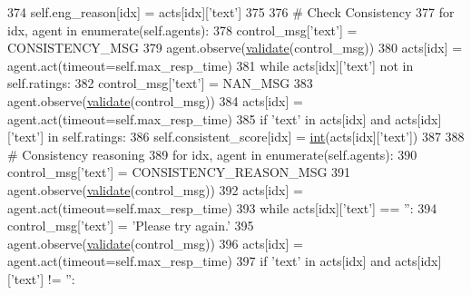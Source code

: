 \begin{DoxyCode}
374                             self.eng\_reason[idx] = acts[idx][\textcolor{stringliteral}{'text'}]
375 
376                     \textcolor{comment}{# Check Consistency}
377                     \textcolor{keywordflow}{for} idx, agent \textcolor{keywordflow}{in} enumerate(self.agents):
378                         control\_msg[\textcolor{stringliteral}{'text'}] = CONSISTENCY\_MSG
379                         agent.observe(\hyperlink{namespaceparlai_1_1core_1_1worlds_afc3fad603b7bce41dbdc9cdc04a9c794}{validate}(control\_msg))
380                         acts[idx] = agent.act(timeout=self.max\_resp\_time)
381                         \textcolor{keywordflow}{while} acts[idx][\textcolor{stringliteral}{'text'}] \textcolor{keywordflow}{not} \textcolor{keywordflow}{in} self.ratings:
382                             control\_msg[\textcolor{stringliteral}{'text'}] = NAN\_MSG
383                             agent.observe(\hyperlink{namespaceparlai_1_1core_1_1worlds_afc3fad603b7bce41dbdc9cdc04a9c794}{validate}(control\_msg))
384                             acts[idx] = agent.act(timeout=self.max\_resp\_time)
385                         \textcolor{keywordflow}{if} \textcolor{stringliteral}{'text'} \textcolor{keywordflow}{in} acts[idx] \textcolor{keywordflow}{and} acts[idx][\textcolor{stringliteral}{'text'}] \textcolor{keywordflow}{in} self.ratings:
386                             self.consistent\_score[idx] = \hyperlink{namespacelanguage__model_1_1eval__ppl_a7d12ee00479673c5c8d1f6d01faa272a}{int}(acts[idx][\textcolor{stringliteral}{'text'}])
387 
388                     \textcolor{comment}{# Consistency reasoning}
389                     \textcolor{keywordflow}{for} idx, agent \textcolor{keywordflow}{in} enumerate(self.agents):
390                         control\_msg[\textcolor{stringliteral}{'text'}] = CONSISTENCY\_REASON\_MSG
391                         agent.observe(\hyperlink{namespaceparlai_1_1core_1_1worlds_afc3fad603b7bce41dbdc9cdc04a9c794}{validate}(control\_msg))
392                         acts[idx] = agent.act(timeout=self.max\_resp\_time)
393                         \textcolor{keywordflow}{while} acts[idx][\textcolor{stringliteral}{'text'}] == \textcolor{stringliteral}{''}:
394                             control\_msg[\textcolor{stringliteral}{'text'}] = \textcolor{stringliteral}{'Please try again.'}
395                             agent.observe(\hyperlink{namespaceparlai_1_1core_1_1worlds_afc3fad603b7bce41dbdc9cdc04a9c794}{validate}(control\_msg))
396                             acts[idx] = agent.act(timeout=self.max\_resp\_time)
397                         \textcolor{keywordflow}{if} \textcolor{stringliteral}{'text'} \textcolor{keywordflow}{in} acts[idx] \textcolor{keywordflow}{and} acts[idx][\textcolor{stringliteral}{'text'}] != \textcolor{stringliteral}{''}:

\end{DoxyCode}
